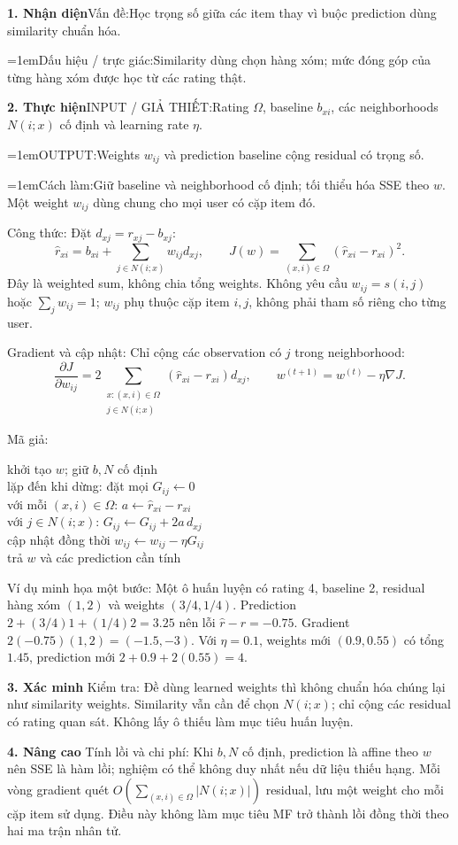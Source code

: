 \documentclass[10pt,a4paper,twocolumn]{article}
\makeatletter
\newcommand{\key}[1]{#1:\enspace}
\newcommand{\algfield}[2]{\par\noindent\hangindent=1em\relax#1:\enspace#2}
\newcommand{\unitheading}[2]{%
  \par\addvspace{1pt}\noindent\textbf{#1. #2}\enspace}
\newcommand{\unitverification}{\unitheading{3}{Xác minh}}
\newcommand{\unitadvanced}{\unitheading{4}{Nâng cao}}
\newcommand{\unitfield}[4]{%
  \par\noindent\textbf{#1. #2}\enspace #3:\enspace #4}
\newcommand{\algsummary}[6]{%
  \begingroup\setlength{\parskip}{1pt}%
  \unitfield{1}{Nhận diện}{Vấn đề}{#1}%
  \algfield{Dấu hiệu / trực giác}{#2}%
  \if\relax\detokenize{#3}\relax\else\par\noindent#3\par\fi%
  \unitfield{2}{Thực hiện}{INPUT / GIẢ THIẾT}{#4}%
  \algfield{OUTPUT}{#5}%
  \algfield{Cách làm}{#6}\par\endgroup}
\newenvironment{algpseudo}{%
  \par\addvspace{2pt}\noindent
  \setlength{\parskip}{0pt}%
  Mã giả:\par\nobreak
  \begin{list}{}{\setlength{\leftmargin}{1em}\setlength{\topsep}{0pt}%
    \setlength{\partopsep}{0pt}\setlength{\parsep}{0pt}%
    \@beginparpenalty=10000\relax}%
  \item\relax
}{\end{list}\par\addvspace{3pt}}
\makeatother
\begin{document}
\algsummary{Học trọng số giữa các item thay vì buộc prediction dùng similarity chuẩn hóa.}{Similarity dùng chọn hàng xóm; mức đóng góp của từng hàng xóm được học từ các rating thật.}{}
{Rating $\Omega$, baseline $b_{xi}$, các neighborhoods $N(i;x)$ cố định và learning rate $\eta$.}{Weights $w_{ij}$ và prediction baseline cộng residual có trọng số.}{Giữ baseline và neighborhood cố định; tối thiểu hóa SSE theo $w$. Một weight $w_{ij}$ dùng chung cho mọi user có cặp item đó.}

\key{Công thức} Đặt $d_{xj}=r_{xj}-b_{xj}$:
\[
\hat r_{xi}=b_{xi}+\sum_{j\in N(i;x)}w_{ij}d_{xj},
\qquad
J(w)=\sum_{(x,i)\in\Omega}(\hat r_{xi}-r_{xi})^2.
\]
Đây là weighted sum, không chia tổng weights. Không yêu cầu $w_{ij}=s(i,j)$ hoặc $\sum_jw_{ij}=1$; $w_{ij}$ phụ thuộc cặp item $i,j$, không phải tham số riêng cho từng user.

\key{Gradient và cập nhật} Chỉ cộng các observation có $j$ trong neighborhood:
\[
\frac{\partial J}{\partial w_{ij}}
=2\!\!\sum_{\substack{x:(x,i)\in\Omega\\j\in N(i;x)}}
(\hat r_{xi}-r_{xi})d_{xj},
\qquad
w^{(t+1)}=w^{(t)}-\eta\nabla J.
\]

\begin{algpseudo}
khởi tạo $w$; giữ $b,N$ cố định\\
lặp đến khi dừng: đặt mọi $G_{ij}\gets0$\\
\quad với mỗi $(x,i)\in\Omega$: $a\gets\hat r_{xi}-r_{xi}$\\
\qquad với $j\in N(i;x)$: $G_{ij}\gets G_{ij}+2a\,d_{xj}$\\
\quad cập nhật đồng thời $w_{ij}\gets w_{ij}-\eta G_{ij}$\\
trả $w$ và các prediction cần tính
\end{algpseudo}

\key{Ví dụ minh họa một bước} Một ô huấn luyện có rating 4, baseline 2, residual hàng xóm $(1,2)$ và weights $(3/4,1/4)$. Prediction $2+(3/4)1+(1/4)2=3.25$ nên lỗi $\hat r-r=-0.75$. Gradient $2(-0.75)(1,2)=(-1.5,-3)$. Với $\eta=0.1$, weights mới $(0.9,0.55)$ có tổng $1.45$, prediction mới $2+0.9+2(0.55)=4$.

\unitverification
\key{Kiểm tra} Đề dùng learned weights thì không chuẩn hóa chúng lại như similarity weights. Similarity vẫn cần để chọn $N(i;x)$; chỉ cộng các residual có rating quan sát. Không lấy ô thiếu làm mục tiêu huấn luyện.

\unitadvanced
\key{Tính lồi và chi phí} Khi $b,N$ cố định, prediction là affine theo $w$ nên SSE là hàm lồi; nghiệm có thể không duy nhất nếu dữ liệu thiếu hạng. Mỗi vòng gradient quét $O(\sum_{(x,i)\in\Omega}|N(i;x)|)$ residual, lưu một weight cho mỗi cặp item sử dụng. Điều này không làm mục tiêu MF trở thành lồi đồng thời theo hai ma trận nhân tử.
\end{document}
